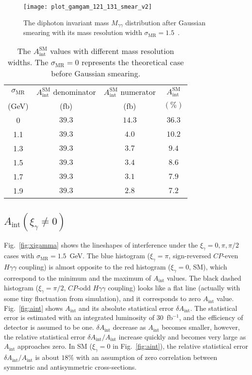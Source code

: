 \documentclass[twocolumn,
prd,amssymb,amsmath,preprintnumbers,
floatfix,aps,nofootinbib]{revtex4-1}
\begin{document}
\begin{figure}[htbp]
\begin{center}
\texttt{[image: plot\_gamgam\_121\_131\_smear\_v2]}
\end{center}
\caption{ The diphoton invariant mass $M_{\gamma\gamma}$ distribution after Gaussian smearing with its mass resolution
width $\sigma_{\text{MR}}=1.5$~.  }
\label{fig:aftersmear}
\end{figure}

\begin{table}[tbp]
\begin{center}
\caption{ The $A^{\text{SM}}_{\text{int}}$ values with different mass resolution widths.
The $\sigma_{\text{MR}}=0$ represents the theoretical case before Gaussian smearing.}
\label{tab:aism}
\begin{tabular}{c|c|c|c}
\hline
$\sigma_{\text{MR}}$ & $A^{\text{SM}}_{\text{int}}$ denominator & $A^{\text{SM}}_{\text{int}}$ numerator & $A^{\text{SM}}_{\text{int}}$ \tabularnewline
(GeV)& (fb)  &(fb)  & $(\%)$ \tabularnewline
 \hline
 0  & $39.3$  & $14.3$ &  $36.3$   \tabularnewline
 \hline
1.1 & $39.3$ & $4.0$  &  $10.2$    \tabularnewline
1.3 & $39.3$ & $3.7$  &  $9.4$    \tabularnewline
1.5 & $39.3$ & $3.4$  &  $8.6$    \tabularnewline
1.7 & $39.3$ & $3.1$  &  $7.9$    \tabularnewline
1.9 & $39.3$ & $2.8$  &  $7.2$    \tabularnewline
\hline
\end{tabular}
\end{center}
\end{table}


\subsection{$A_{\text{int}}(\xi_\gamma\ne 0)$}

Fig.~\ref{fig:xigamma} shows the lineshapes of interference under
the $\xi_\gamma=0, \pi, \pi/2$ cases with $\sigma_{\text{MR}}=1.5$~GeV.
 The blue histogram ($\xi_\gamma=\pi$, sign-reversed $CP$-even $H\gamma\gamma$ coupling) is
almost opposite to the red histogram ($\xi_\gamma= 0$, SM), which correspond to
the minimum and the maximum of $A_{\text{int}}$ values.
The black dashed
histogram ($\xi_\gamma=\pi/2$, $CP$-odd $H\gamma\gamma$ coupling) looks like a flat line
(actually with some tiny fluctuation from simulation), and it corresponds to zero $A_{\text{int}}$ value.
Fig.~\ref{fig:aint} shows $A_{\text{int}}$ and its absolute statistical error $\delta A_{\text{int}}$.
The statistical error is estimated with an integrated luminosity of 30~fb$^{-1}$, and the efficiency of detector is assumed to be one.
$\delta A_{\text{int}}$ decrease as
$A_{\text{int}}$ becomes smaller,
however, the relative statistical error $\delta A_{\text{int}}/A_{\text{int}}$
increase quickly and becomes very large as $A_{\text{int}}$ approaches zero.
In SM ($\xi_\gamma= 0$ in Fig.~\ref{fig:aint}), the relative statistical error $\delta A_{\text{int}}/A_{\text{int}}$
 is about $18\%$ with an assumption of zero correlation between symmetric and antisymmetric cross-sections.
\end{document}
